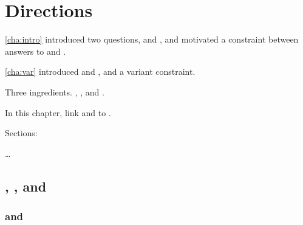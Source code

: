 \chapter{Directions}
\label{cha:binding}

\begin{note}
  \autoref{cha:intro} introduced two questions, \qWhy{} and \qHow{}, and motivated a constraint between answers to \qWhy{} and \qHow{}.

  \autoref{cha:var} introduced \qWhyV{} and \qHowV{}, and a variant constraint.

  Three ingredients.
  , \tC{}, and .

  In this chapter, link  and  to \qWhyV{}.
\end{note}

\begin{note}
  Sections:
  \begin{TOCEnum}
  \item
    \dots
  \end{TOCEnum}
\end{note}


\section{, \qWhyV{}, and \issueConstraint{}}
\label{sec:comining-ingredients}


\subsection{ and \qWhyV{}}

